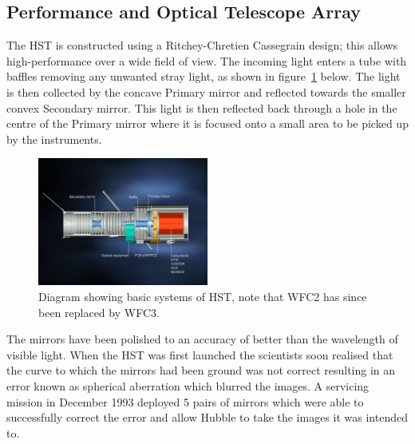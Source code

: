 	\subsection{Performance and Optical Telescope Array} %
	\label{ssub:performance_and_optical_telescope_array}
		The HST is constructed using a Ritchey-Chretien Cassegrain design; this allows high-performance over a wide field of view. The incoming light enters a tube with baffles removing any unwanted stray light, as shown in figure~\ref{fig:HST_optical_diagram} below. The light is then collected by the concave Primary mirror and reflected towards the smaller convex Secondary mirror. This light is then reflected back through a hole in the centre of the Primary mirror where it is focused onto a small area to be picked up by the instruments\cite{Hubsite_5}.
		\begin{figure}[ht]
			\centering
			\includegraphics[width=0.5\textwidth]{../Images/HST_optical_diagram.jpg}
			\caption{Diagram showing basic systems of HST, note that WFC2 has since been replaced by WFC3.\label{fig:HST_optical_diagram}}
		\end{figure}

		The mirrors have been polished to an accuracy of better than the wavelength of visible light. When the HST was first launched the scientists soon realised that the curve to which the mirrors had been ground was not correct resulting in an error known as spherical aberration which blurred the images. A servicing mission in December 1993 deployed 5 pairs of mirrors which were able to successfully correct the error and allow Hubble to take the images it was intended to\cite{ESA_1}.

